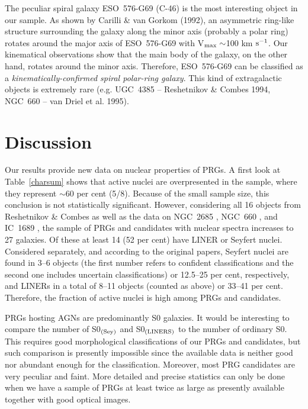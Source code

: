 The  peculiar  spiral  galaxy  ESO~576-G69  (C-46) is the most  interesting
object  in our  sample.  As shown  by  Carilli  \& van  Gorkom  (1992),  an
asymmetric ring-like structure  surrounding the galaxy along the minor axis
(probably a polar ring) rotates around the major axis of  ESO~576-G69  with
V$_{\rm  max}\sim$100 km $\rm s^{-1}$.  Our kinematical  observations  show
that the main body of the  galaxy, on the other  hand,  rotates  around the
minor  axis.  Therefore,   ESO~576-G69   can  be   classified   as  a  {\it
kinematically-confirmed   spiral   polar-ring   galaxy}.   This   kind   of
extragalactic  objects is extremely rare (e.g.  UGC~4385 --  Reshetnikov \&
Combes 1994, NGC~660 -- van Driel et al.  1995).

\section{Discussion}

Our results  provide new data on nuclear  properties of PRGs.  A first look
at  Table~\ref{charsum}  shows that active nuclei are  overpresented in the
sample, where they represent $\sim$60 per cent (5/8).  Because of the small
sample size, this  conclusion is not  statistically  significant.  However,
considering  all 16 objects from  Reshetnikov \& Combes    as
well as the data on NGC~2685  \cite{wef},  NGC~660  \cite{van}, and IC~1689
\cite{ht}, the sample of PRGs and candidates with nuclear spectra increases
to 27  galaxies.  Of these at least 14 (52 per cent) have  LINER or Seyfert
nuclei.  Considered  separately,  and  according  to the  original  papers,
Seyfert  nuclei  are found in 3--6  objects  (the  first  number  refers to
confident   classifications   and  the  second   one   includes   uncertain
classifications) or 12.5--25 per cent,  respectively, and LINERs in a total
of 8--11  objects  (counted  as above) or 33--41 per cent.  Therefore,  the
fraction of active nuclei is high among PRGs and candidates.

PRGs hosting AGNs are  predominantly  S0 galaxies.  It would be interesting
to compare  the number of  S0$_{\rm(Sey)}$  and  S0$_{\rm(LINERS)}$  to the
number of ordinary S0.  This requires good morphological classifications of
our PRGs and candidates, but such comparison is presently  impossible since
the   available   data  is  neither  good  nor  abundant   enough  for  the
classification.  Moreover, most PRG candidates are very peculiar and faint.
More detailed and precise statistics can only be done when we have a sample
of PRGs at least twice as large as presently  available  together with good
optical images.

